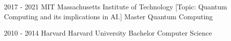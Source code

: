     \begin{sidesection}
   
        \education
            {2017 - 2021}
            {MIT}
            {Massachusetts Institute of Technology}
            [Topic: Quantum Computing and its implications in AI.]
            {Master}
            {Quantum Computing}

    \vspace{1.4ex}

        \education
            {2010 - 2014}
            {Harvard}
            {Harvard University}
            {Bachelor}
            {Computer Science}
	\end{sidesection}